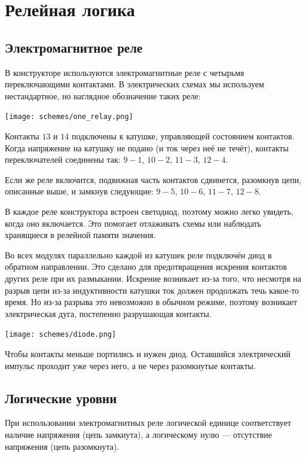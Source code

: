 \chapter{Релейная логика}

\section{Электромагнитное реле}

В конструкторе используются электромагнитные реле с четырьмя
переключающими контактами. В электрических схемах
мы используем нестандартное, но наглядное обозначение таких реле:

\begin{center}
\texttt{[image: schemes/one\_relay.png]}
\end{center}


Контакты $13$ и $14$ подключены к катушке, управляющей состоянием контактов.
Когда напряжение на катушку не подано (и ток через неё не течёт),
контакты переключателей соединены так: $9-1$, $10-2$, $11-3$, $12-4$.

Если же реле включится, подвижная часть контактов сдвинется, разомкнув цепи,
описанные выше, и замкнув следующие: $9-5$, $10-6$, $11-7$, $12-8$.

В каждое реле конструктора встроен светодиод, поэтому можно легко увидеть,
когда оно включается. Это помогает отлаживать схемы или наблюдать
хранящиеся в релейной памяти значения.

Во всех модулях параллельно каждой из катушек реле подключён диод в обратном
направлении. Это сделано для предотвращения искрения контактов других реле
при их размыкании.
Искрение возникает из-за того, что несмотря на разрыв цепи из-за индуктивности катушки
ток должен продолжать течь какое-то время. Но из-за разрыва это невозможно
в обычном режиме, поэтому возникает электрическая дуга, постепенно разрушающая контакты.

\begin{center}
\texttt{[image: schemes/diode.png]}
\end{center}

Чтобы контакты меньше портились и нужен диод. Оставшийся электрический импульс проходит
уже через него, а не через разомкнутые контакты.

\section{Логические уровни}

При использовании электромагнитных реле логической единице соответствует
наличие напряжения (цепь замкнута), а логическому нулю --- отсутствие напряжения
(цепь разомкнута).

